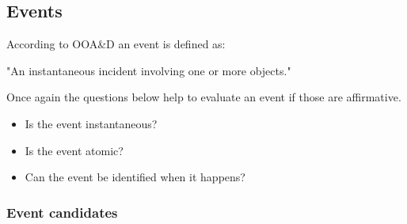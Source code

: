 \subsection{Events}

According to OOA\&D an event is defined as\citep[p.~53]{Rod-Aalborg}:

"An instantaneous incident involving one or more objects."

Once again the questions below help to evaluate an event if those are affirmative\citep[p.~65]{Rod-Aalborg}.
\begin{itemize}
	\item Is the event instantaneous?
	\item Is the event atomic?
	\item Can the event be identified when it happens?
\end{itemize}




\subsubsection{Event candidates}


